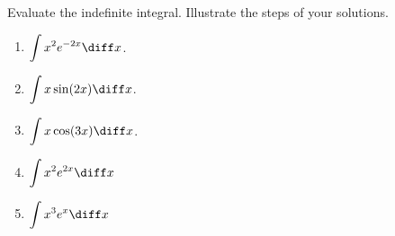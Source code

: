 Evaluate the indefinite integral. Illustrate the steps of your solutions.
\begin{multicols}{2}
\begin{enumerate}
\item \label{problemintx^2e^(-2x)dx} $\displaystyle \int x^2 e^{-2x}\diff x$.
\item $\displaystyle \int x \sin (2x)\diff x$.
\item $\displaystyle \int x \cos (3x)\diff x$.
\item $\displaystyle \int x^2 e^{2x}\diff x$
\item $\displaystyle \int x^3 e^x \diff x$
\end{enumerate}
\end{multicols}